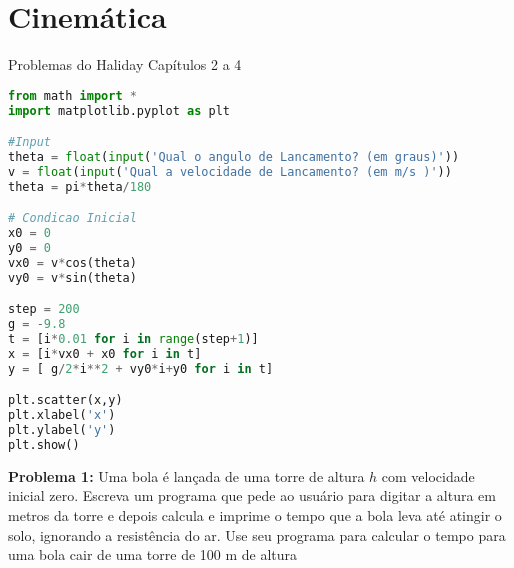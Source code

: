 \chapter{Cinemática}
Problemas do Haliday Capítulos 2 a 4

\begin{lstlisting}[language=Python, frame=lines,basicstyle=\footnotesize, caption={Lançamento de Projeteis}, label={lst:projeteis1}]
from math import *
import matplotlib.pyplot as plt

#Input
theta = float(input('Qual o angulo de Lancamento? (em graus)'))
v = float(input('Qual a velocidade de Lancamento? (em m/s )'))
theta = pi*theta/180

# Condicao Inicial
x0 = 0
y0 = 0
vx0 = v*cos(theta)
vy0 = v*sin(theta)

step = 200
g = -9.8
t = [i*0.01 for i in range(step+1)]
x = [i*vx0 + x0 for i in t]
y = [ g/2*i**2 + vy0*i+y0 for i in t]

plt.scatter(x,y)
plt.xlabel('x')
plt.ylabel('y')
plt.show()
\end{lstlisting}



{\bf Problema 1:}
Uma bola é lançada de uma torre de altura $h$ com velocidade inicial zero. Escreva um
programa que pede ao usuário para digitar a altura em metros da torre e depois calcula
e imprime o tempo que a bola leva até atingir o solo, ignorando a resistência do ar. Use
seu programa para calcular o tempo para uma bola cair de uma torre de 100 m de altura